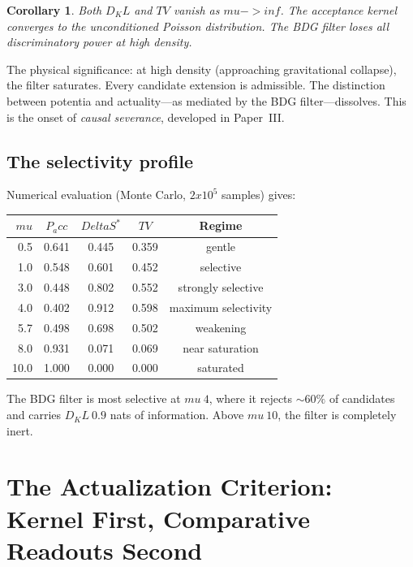 \documentclass[11pt]{article}
\def\Delta{Delta}%
\def\mu{mu}%
\def\mathrm#1{#1}%
\def\times{x}%
\def\approx{~}%
\def\to{->}%
\def\infty{inf}%
\def\Pacc{P_acc}%
\def\Dkl{D_KL}%
\def\TV{TV}%
\newtheorem{corollary}{Corollary}
\newcommand{\Pacc}{\ensuremath{P_{\mathrm{acc}}}}
\newcommand{\Dkl}{\ensuremath{D_{\mathrm{KL}}}}
\newcommand{\TV}{\ensuremath{\mathrm{TV}}}
\begin{document}
\begin{corollary}
Both $\Dkl$ and $\TV$ vanish as $\mu\to\infty$. The acceptance kernel converges to the unconditioned Poisson distribution. The BDG filter loses all discriminatory power at high density.
\end{corollary}

The physical significance: at high density (approaching gravitational collapse), the filter saturates. Every candidate extension is admissible. The distinction between potentia and actuality---as mediated by the BDG filter---dissolves. This is the onset of \emph{causal severance}, developed in Paper~III.

\subsection{The selectivity profile}

Numerical evaluation (Monte Carlo, $2\times 10^5$ samples) gives:

\begin{center}
\begin{tabular}{rcccc}
\toprule
$\mu$ & $\Pacc$ & $\Delta S^*$ & $\TV$ & Regime \\
\midrule
0.5 & 0.641 & 0.445 & 0.359 & gentle \\
1.0 & 0.548 & 0.601 & 0.452 & selective \\
3.0 & 0.448 & 0.802 & 0.552 & strongly selective \\
4.0 & 0.402 & 0.912 & 0.598 & maximum selectivity \\
5.7 & 0.498 & 0.698 & 0.502 & weakening \\
8.0 & 0.931 & 0.071 & 0.069 & near saturation \\
10.0 & 1.000 & 0.000 & 0.000 & saturated \\
\bottomrule
\end{tabular}
\end{center}

The BDG filter is most selective at $\mu\approx 4$, where it rejects $\sim 60\%$ of candidates and carries $\Dkl\approx 0.9$ nats of information. Above $\mu\approx 10$, the filter is completely inert.

\section{The Actualization Criterion: Kernel First, Comparative Readouts Second}
\label{sec:criterion}
\end{document}
